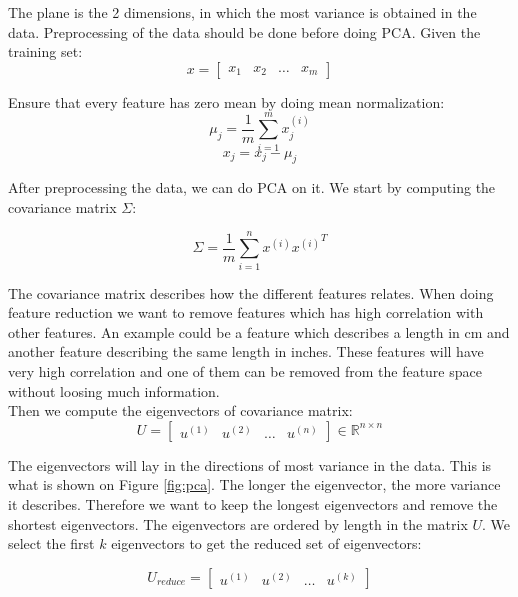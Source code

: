 The plane is the 2 dimensions, in which the most variance is obtained in the data. Preprocessing of the data should be done before doing PCA. Given the training set:
\begin{equation}
x = 
\begin{bmatrix}
x_1 & x_2 & \dots & x_m
\end{bmatrix}
\end{equation}

Ensure that every feature has zero mean by doing mean normalization:
\begin{equation}
\mu_j = \frac{1}{m} \sum^m_{i=1} x_j^{(i)}
\end{equation}
\begin{equation}
x_j = x_j - \mu_j
\end{equation}

After preprocessing the data, we can do PCA on it. We start by computing the covariance matrix $\Sigma$:

\begin{equation}
\Sigma = \frac{1}{m} \sum^n_{i=1} x^{(i)} {x^{(i)}}^T
\end{equation}

The covariance matrix describes how the different features relates. When doing feature reduction we want to remove features which has high correlation with other features.
An example could be a feature which describes a length in cm and another feature describing the same length in inches.
These features will have very high correlation and one of them can be removed from the feature space without loosing much information. \\

Then we compute the eigenvectors of covariance matrix:
\begin{equation}
U = \begin{bmatrix}
   u^{(1)} & u^{(2)} & \dots & u^{(n)}
 \end{bmatrix}
\in \mathbb{R}^{n \times n}
\end{equation}

The eigenvectors will lay in the directions of most variance in the data. This is what is shown on Figure \ref{fig:pca}.
The longer the eigenvector, the more variance it describes.
Therefore we want to keep the longest eigenvectors and remove the shortest eigenvectors. The eigenvectors are ordered by length in the matrix $U$.  We select the first $k$ eigenvectors to get the reduced set of eigenvectors:

\begin{equation}
U_{reduce} = \begin{bmatrix}
   u^{(1)} & u^{(2)} & \dots & u^{(k)}
 \end{bmatrix}
\end{equation}

